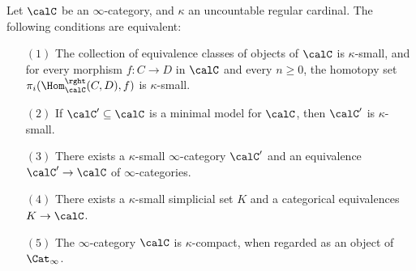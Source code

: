 \begin{proposition}\label{grapeape}
Let $\calC$ be an $\infty$-category, and $\kappa$ an uncountable regular cardinal.
The following conditions are equivalent:
\begin{itemize}
\item[$(1)$] The collection of equivalence classes of objects of $\calC$ is $\kappa$-small, and for every morphism $f: C \rightarrow D$ in $\calC$ and every $n \geq 0$, the homotopy set
$\pi_i( \Hom^{\rght}_{\calC}(C,D), f)$ is $\kappa$-small. 

\item[$(2)$] If $\calC' \subseteq \calC$ is a minimal model for $\calC$, then $\calC'$ is $\kappa$-small.

\item[$(3)$] There exists a $\kappa$-small $\infty$-category $\calC'$ and an equivalence
$\calC' \rightarrow \calC$ of $\infty$-categories.

\item[$(4)$] There exists a $\kappa$-small simplicial set $K$ and a categorical equivalences
$K \rightarrow \calC$.

\item[$(5)$] The $\infty$-category $\calC$ is $\kappa$-compact, when regarded as an object of
$\Cat_{\infty}$.

\end{itemize}
\end{proposition}

